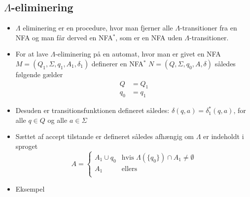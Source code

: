 \documentclass[a4, danish]{article}
\begin{document}
\subsection{$\Lambda$-eliminering}
\begin{itemize}
  \item $\Lambda$ eliminering er en procedure, hvor man fjerner alle $\Lambda$-transitioner fra en NFA og man får derved en NFA$^*$, som er en NFA uden $\Lambda$-transitioner.
  \item For at lave $\Lambda$-eliminering på en automat, hvor man er givet en NFA $M=(Q_1,\Sigma,q_1,A_1,\delta_1)$ definerer en NFA$^*$ $N=(Q,\Sigma,q_0,A,\delta)$ således følgende gælder
  \begin{align*}
    Q &= Q_1 \\
    q_0 &= q_1 
  \end{align*}
  \item Desuden er transitionsfunktionen defineret således: $\delta(q,a) = \delta_1^*(q,a)$, for alle $q \in Q$ og alle $a\in \Sigma$
  \item Sættet af accept tilstande er defineret således afhængig om $\Lambda$ er indeholdt i sproget
  \begin{equation*}
  	A =
  		\begin{cases}
  			\mbox{$A_1 \cup {q_0}$} & \mbox{hvis $\Lambda(\{q_0\})\cap A_1 \ne \emptyset$} \\
  			\mbox{$A_1$} & \mbox{ellers} \\
  		\end{cases}
  \end{equation*}    
  \item Eksempel
  \begin{center}  
  \end{center}
\end{itemize}
\end{document}
